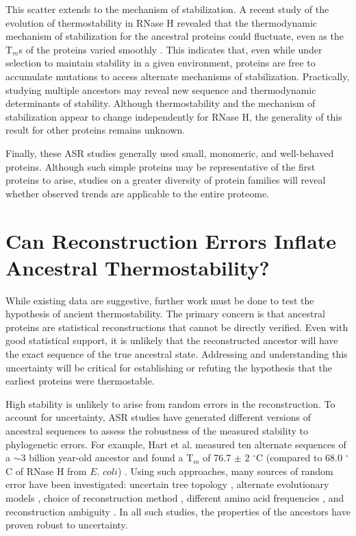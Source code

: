 This scatter extends to the mechanism of stabilization. A recent study
of the evolution of thermostability in RNase H revealed that the thermodynamic
mechanism of stabilization for the ancestral proteins could fluctuate,
even as the T$_{m}$s of the proteins varied smoothly \cite{hart_thermodynamic_2014}.
This indicates that, even while under selection to maintain stability
in a given environment, proteins are free to accumulate mutations
to access alternate mechanisms of stabilization. Practically, studying
multiple ancestors may reveal new sequence and thermodynamic determinants
of stability. Although thermostability and the mechanism of stabilization
appear to change independently for RNase H, the generality of this
result for other proteins remains unknown.

Finally, these ASR studies generally used small, monomeric, and well-behaved
proteins. Although such simple proteins may be representative of the
first proteins to arise, studies on a greater diversity of protein
families will reveal whether observed trends are applicable to the
entire proteome.

\section{Can Reconstruction Errors Inflate Ancestral Thermostability?}

While existing data are suggestive, further work must be done to test
the hypothesis of ancient thermostability. The primary concern is
that ancestral proteins are statistical reconstructions that cannot
be directly verified. Even with good statistical support, it is unlikely
that the reconstructed ancestor will have the exact sequence of the
true ancestral state. Addressing and understanding this uncertainty
will be critical for establishing or refuting the hypothesis that
the earliest proteins were thermostable.

High stability is unlikely to arise from random errors in the reconstruction.
To account for uncertainty, ASR studies have generated different versions
of ancestral sequences to assess the robustness of the measured stability
to phylogenetic errors. For example, Hart et al. measured ten alternate
sequences of a $\sim$3 billion year-old ancestor and found a T$_{m}$
of 76.7 $\pm$ 2 $^{\circ}$C (compared to 68.0 $^{\circ}$C of RNase
H from $\textit{E. coli}$) \cite{hart_thermodynamic_2014}. Using
such approaches, many sources of random error have been investigated:
uncertain tree topology \cite{gaucher_palaeotemperature_2008,akanuma_experimental_2013,groussin_toward_2015,hanson-smith_robustness_2010},
alternate evolutionary models \cite{akanuma_robustness_2015}, choice
of reconstruction method \cite{hobbs_origin_2012,hanson-smith_robustness_2010},
different amino acid frequencies \cite{gaucher_palaeotemperature_2008},
and reconstruction ambiguity \cite{gaucher_palaeotemperature_2008,akanuma_experimental_2013,risso_thermostable_2014,hart_thermodynamic_2014,bar-rogovsky_assessing_2015}.
In all such studies, the properties of the ancestors have proven robust
to uncertainty.

